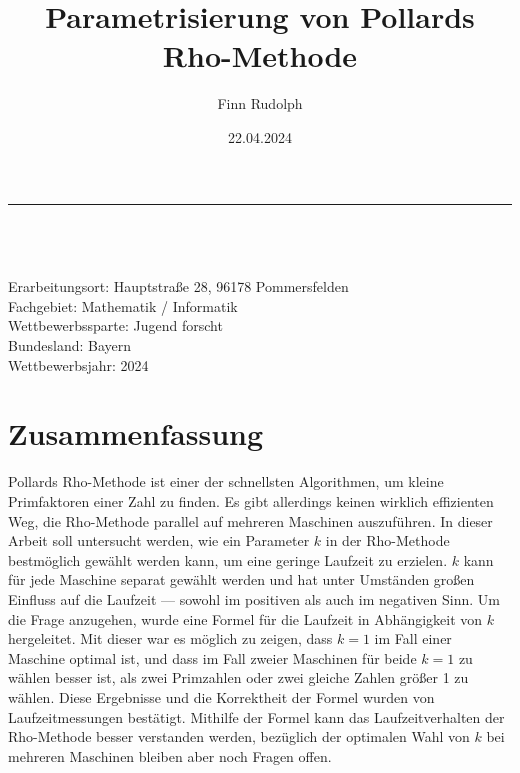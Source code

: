 \documentclass[a4paper, 11pt, ngerman]{article}
\title{Parametrisierung von Pollards Rho-Methode}
\author{Finn Rudolph}
\date{22.04.2024}
\theoremstyle{definition}
\theoremstyle{plain}
\theoremstyle{remark}
\begin{document}
\titleformat{\subsection}[runin]{\bfseries}{\thesubsection}{0.5em}{}

\setcounter{tocdepth}{1}

\begin{titlepage}

    \noindent\rule{\textwidth}{0.4pt}

    \makeatletter
    \begin{flushleft}
        \textbf{\LARGE{\@title}} \\
        \vspace{1.5em}
        \@author \\
        \@date \\
        \vspace{1em}
        Erarbeitungsort: Hauptstraße 28, 96178 Pommersfelden \\
        Fachgebiet: Mathematik / Informatik \\
        Wettbewerbssparte: Jugend forscht \\
        Bundesland: Bayern \\
        Wettbewerbsjahr: 2024
    \end{flushleft}

    \vspace{0.2em}

    \section*{Zusammenfassung}

    Pollards Rho-Methode ist einer der schnellsten Algorithmen, um kleine Primfaktoren einer Zahl zu finden. Es gibt allerdings keinen wirklich effizienten Weg, die Rho-Methode parallel auf mehreren Maschinen auszuführen. In dieser Arbeit soll untersucht werden, wie ein Parameter $k$ in der Rho-Methode bestmöglich gewählt werden kann, um eine geringe Laufzeit zu erzielen. $k$ kann für jede Maschine separat gewählt werden und hat unter Umständen großen Einfluss auf die Laufzeit --- sowohl im positiven als auch im negativen Sinn. Um die Frage anzugehen, wurde eine Formel für die Laufzeit in Abhängigkeit von $k$ hergeleitet. Mit dieser war es möglich zu zeigen, dass $k = 1$ im Fall einer Maschine optimal ist, und dass im Fall zweier Maschinen für beide $k = 1$ zu wählen besser ist, als zwei Primzahlen oder zwei gleiche Zahlen größer 1 zu wählen. Diese Ergebnisse und die Korrektheit der Formel wurden von Laufzeitmessungen bestätigt. Mithilfe der Formel kann das Laufzeitverhalten der Rho-Methode besser verstanden werden, bezüglich der optimalen Wahl von $k$ bei mehreren Maschinen bleiben aber noch Fragen offen.

    \vspace{0.5em}

    \tableofcontents

    \thispagestyle{empty}
\end{titlepage}
\end{document}
